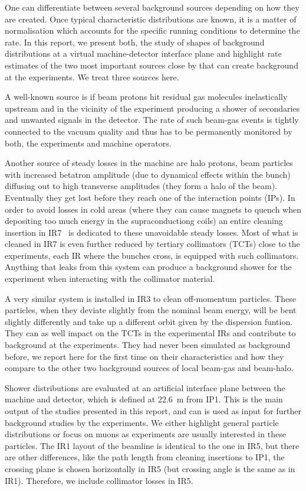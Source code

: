 One can differentiate between several background sources depending on how they are created. Once typical characteristic distributions are known, it is a matter of normalisation which accounts for the specific running conditions to determine the rate. In this report, we present both, the study of shapes of background distributions at a virtual machine-detector interface plane and highlight rate estimates of the two most important sources close by that can create background at the experiments. We treat three sources here.

A well-known source is if beam protons hit residual gas molecules inelastically upstream and in the vicinity of the experiment producing a shower of secondaries and unwanted signals in the detector. The rate of such beam-gas events is tightly connected to the vacuum quality and thus has to be permanently monitored by both, the experiments and machine operators.

Another source of steady losses in the machine are halo protons, beam particles with increased betatron amplitude (due to dynamical effects within the bunch) diffusing out to high transverse amplitudes (they form a halo of the beam). Eventually they get lost before they reach one of the interaction points (IPs). In order to avoid losses in cold areas (where they can cause magnets to quench when depositing too much energy in the supraconductiong coils) an entire cleaning insertion in IR7~\cite{LHCDesignRep,assmann05chamonix} is dedicated to these unavoidable steady losses. Most of what is cleaned in IR7 is even further reduced by tertiary collimators (TCTs) close to the experiments, each IR where the bunches cross, is equipped with such collimators. Anything that leaks from this system can produce a background shower for the experiment when interacting with the collimator material. 

A very similar system is installed in IR3 to clean off-momentum particles. These particles, when they deviate slightly from the nominal beam energy, will be bent slightly differently and take up a different orbit given by the dispersion funtion. They can as well impact on the TCTs in the experimental IRs and contribute to background at the experiments. They had never been simulated as background before, we report here for the first time on their characteristics and how they compare to the other two background sources of local beam-gas and beam-halo. 

Shower distributions are evaluated at an artificial interface plane between the machine and detector, which is defined at 22.6~m from IP1. This is the main output of the studies presented in this report, and can is used as input for further background studies by the experiments. We either highlight general particle distributions or focus on muons as experiments are usually interested in these particles. The IR1 layout of the beamline is identical to the one in IR5, but there are other differences, like the path length from cleaning insertions to IP1, the crossing plane is chosen horizontally in IR5 (but crossing angle is the same as in IR1). Therefore, we include collimator losses in IR5.

